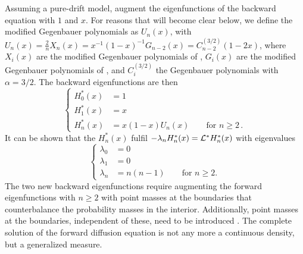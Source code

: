 \documentclass[preprint]{elsarticle}
\begin{document}
Assuming a pure-drift model, \citet{Tran14a}  augment the eigenfunctions of the backward equation with $1$ and $x$. For reasons that will become clear below, we define the modified Gegenbauer polynomials as $U_{n}(x)$, with $U_n(x)=\frac{2}{n}X_n(x)=x^{-1}(1-x)^{-1}G_{n-2}(x)=C_{n-2}^{(3/2)}(1-2x)$, where $X_i(x)$ are the modified Gegenbauer polynomials of \citet{Tran14a}, $G_i(x)$ are the modified Gegenbauer polynomials of \citet{Song12}, and $C_{i}^{(3/2)}$ the Gegenbauer polynomials \citep{Abra70} with $\alpha=3/2$. The backward eigenfunctions are then
\begin{equation}\label{eq:backw_Tran}
\begin{cases}
    H_0^{*}(x)&=1\\
    H_1^{*}(x)&=x\\
    H_n^{*}(x)&=x(1-x)U_n(x)\qquad\text{for $n\geq 2$}\,.
\end{cases}
\end{equation}
It can be shown that the $H_n^{*}(x)$ fulfil $-\lambda_n H_n^{*}(x)={\cal L}^{*}H_n^{*}(x)$ with eigenvalues
\begin{equation}\label{eq:pure_drift_ev}
\begin{cases}
    \lambda_0&=0\\
    \lambda_1&=0\\
    \lambda_n&=n(n-1)\qquad\text{for $n\geq 2$}.
\end{cases}
\end{equation}
The two new backward eigenfunctions require augmenting the forward eigenfunctions with $n\geq 2$ with point masses at the boundaries that counterbalance the probability masses in the interior. Additionally, point masses at the boundaries, independent of these, need to be introduced \citep{Tran14a}. The complete solution of the forward diffusion equation is not any more a continuous density, but a generalized measure. 
\end{document}
